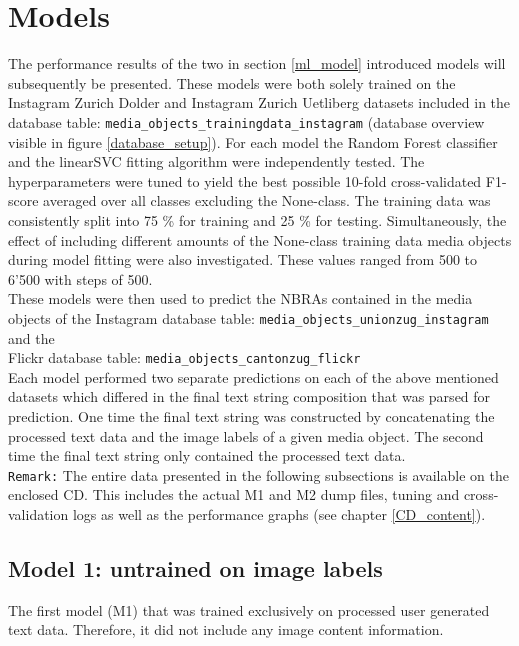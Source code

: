\section{Models} \label{results_models}
The performance results of the two in section \ref{ml_model} introduced models will subsequently be presented. These models were both solely trained on the Instagram Zurich Dolder and Instagram Zurich Uetliberg datasets included in the database table: \texttt{media\_objects\_trainingdata\_instagram} (database overview visible in figure \ref{database_setup}). For each model the Random Forest classifier and the linearSVC fitting algorithm were independently tested. The hyperparameters were tuned to yield the best possible 10-fold cross-validated F1-score averaged over all classes excluding the None-class. The training data was consistently split into 75 \% for training and 25 \% for testing. Simultaneously, the effect of including different amounts of the None-class training data media objects during model fitting were also investigated. These values ranged from 500 to 6'500 with steps of 500.\\
These models were then used to predict the NBRAs contained in the media objects of the Instagram database table: \texttt{media\_objects\_unionzug\_instagram} and the \\Flickr database table: \texttt{media\_objects\_cantonzug\_flickr}\\
Each model performed two separate predictions on each of the above mentioned datasets which differed in the final text string composition that was parsed for prediction. One time the final text string was constructed by concatenating the processed text data and the image labels of a given media object. The second time the final text string only contained the processed text data.\\
\newline
\texttt{Remark:} The entire data presented in the following subsections is available on the enclosed CD. This includes the actual M1 and M2 dump files, tuning and cross-validation logs as well as the performance graphs (see chapter \ref{CD_content}).

\subsection{Model 1: untrained on image labels}
The first model (M1) that was trained exclusively on processed user generated text data. Therefore, it did not include any image content information.

